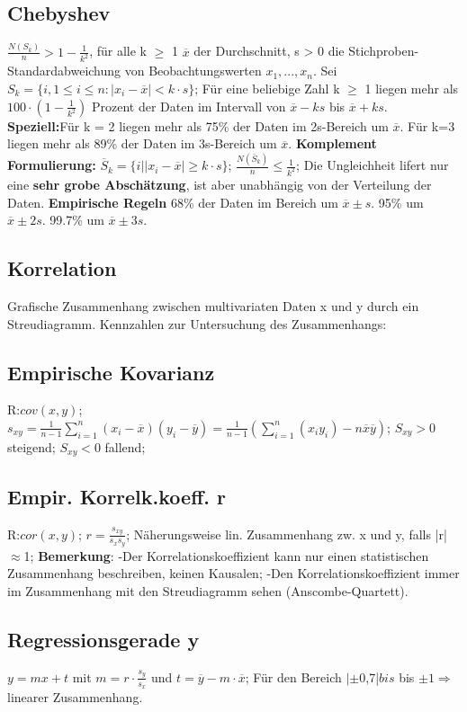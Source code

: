       \subsection{Chebyshev}
      $\frac{N(S_{k})}{n} > 1-\frac{1}{k^2}$, für alle k $\geq$ 1
      $\overline{x}$ der Durchschnitt, s > 0 die Stichproben-Standardabweichung von Beobachtungswerten $x_{1}, ..., x_{n}$. Sei $S_{k} = \{i, 1 \leq i \leq n: |x_{i} - \overline{x}| < k \cdot s\}$; Für eine beliebige Zahl k $\geq$ 1 liegen mehr als $100 \cdot (1-\frac{1}{k^2})$ Prozent der Daten im Intervall von $\overline{x} - ks$ bis $ \overline{x} + ks$. \textbf{Speziell:}Für k = 2 liegen mehr als 75\% der Daten im 2s-Bereich um $\overline{x}$. Für k=3 liegen mehr als 89\% der Daten im 3s-Bereich um $\overline{x}$. \textbf{Komplement Formulierung:} $\overline{S}_{k} = \{i | |x_{i}-\overline{x}| \geq k \cdot s\}$; 
      $\frac{N(\overline{S}_{k})}{n} \leq \frac{1}{k^2}$; Die Ungleichheit lifert nur eine \textbf{sehr grobe Abschätzung}, ist aber unabhängig von der Verteilung der Daten. \textbf{Empirische Regeln} 68\% der Daten im Bereich um $\overline{x} \pm s$. 95\% um $\overline{x} \pm 2s$. 99.7\% um $\overline{x} \pm3s$.
      \subsection{Korrelation}
      Grafische Zusammenhang zwischen multivariaten Daten x und y durch ein Streudiagramm. Kennzahlen zur Untersuchung des Zusammenhangs:
      \subsection{Empirische Kovarianz}
      R:$cov(x,y)$;
      $s_{xy} = \frac{1}{n-1}\sum_{i=1}^{n}(x_{i}-\overline{x})(y_{i}-\overline{y})=\frac{1}{n-1}(\sum_{i=1}^{n}(x_{i}y_{i})- n\overline{x}\overline{y})$; 
      $ S_{xy} > 0 $ steigend; 
      $ S_{xy} < 0 $ fallend; 
      \subsection{Empir. Korrelk.koeff. r}
      R:$cor(x,y)$;
      $r = \frac{s_{xy}}{s_{x}s_{y}}$; Näherungsweise lin. Zusammenhang zw. x und y, falls |r| $\approx$1;
      \textbf{Bemerkung}: -Der Korrelationskoeffizient kann nur einen statistischen Zusammenhang beschreiben, keinen Kausalen; -Den Korrelationskoeffizient immer im Zusammenhang mit den Streudiagramm sehen (Anscombe-Quartett).
      \subsection{Regressionsgerade y}
      $y = mx + t$ mit $m=r \cdot \frac{s_{y}}{s_{x}}$ und $ t=\overline{y} -m \cdot \overline{x}$;
      Für den Bereich $|\pm$0,7|$ bis $ bis $\pm 1   \Rightarrow $ linearer Zusammenhang.